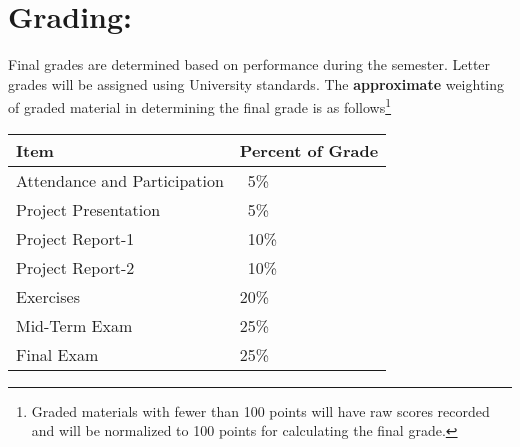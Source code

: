 \documentclass[12pt]{article}
\begin{document}
\section*{Grading:} Final grades are determined based on performance during the semester.  Letter grades will be assigned using University standards.  The \textbf{approximate} weighting of graded material in determining the final grade is as follows\footnote{Graded materials with fewer than 100 points will have raw scores recorded and will be normalized to 100 points for calculating the final grade.}
\begin{table}[h!]
   \centering
   \begin{tabular}{l l}
Item & Percent of Grade \\
\hline
\hline
Attendance and Participation & ~5\% \\
Project Presentation & ~5\% \\
Project Report-1 & ~10\% \\
Project Report-2 & ~10\% \\
Exercises & 20\% \\
Mid-Term Exam & 25\% \\
Final Exam & 25\% \\
\hline
\end{tabular}
\end{table}

\clearpage
\end{document}
